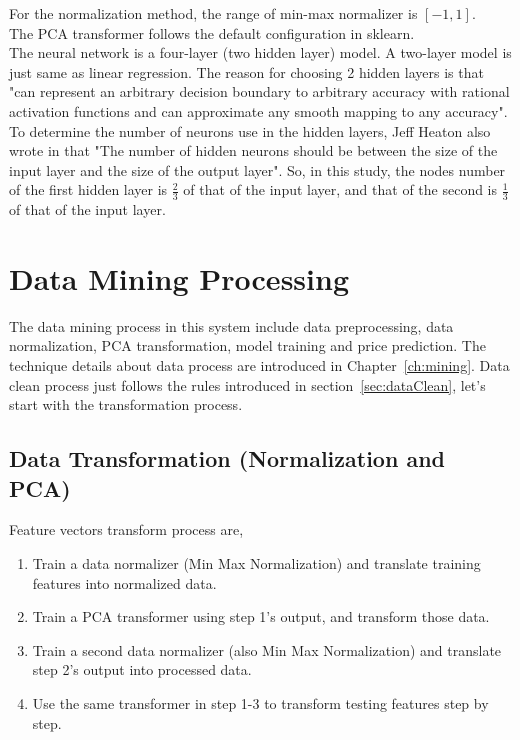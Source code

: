 For the normalization method, the range of min-max normalizer is $ [-1, 1] $.\\

The PCA transformer follows the default configuration in sklearn.\\

The neural network is a four-layer (two hidden layer) model. A two-layer model is just same as linear regression. The reason for choosing 2 hidden layers is that "can represent an arbitrary decision boundary to arbitrary accuracy with rational activation functions and can approximate any smooth mapping to any accuracy"\cite[p.~128]{heaton2008introduction}.\\


To determine the number of neurons use in the hidden layers, Jeff Heaton also wrote in \cite[p.~129]{heaton2008introduction} that "The number of hidden neurons should be between the size of the input layer and the size of the output layer". So, in this study, the nodes number of the first hidden layer is $ \frac{2}{3} $ of that of the input layer, and that of the second is $ \frac{1}{3} $ of that of the input layer.

\section{Data Mining Processing}
The data mining process in this system include data preprocessing, data normalization, PCA transformation, model training and price prediction. The technique details about data process are introduced in Chapter~\ref{ch:mining}. Data clean process just follows the rules introduced in section~\ref{sec:dataClean}, let's start with the transformation process.

\subsection{Data Transformation (Normalization and PCA)}

Feature vectors transform process are,
\begin{enumerate}
	\item Train a data normalizer (Min Max Normalization) and translate training features into normalized data.
	\item Train a PCA transformer using step 1's output, and transform those data.
	\item Train a second data normalizer (also Min Max Normalization) and translate step 2's output into processed data.
	\item Use the same transformer in step 1-3 to transform testing features step by step.
\end{enumerate}

